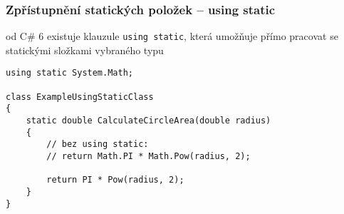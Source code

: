 \begin{frame}[fragile]
\frametitle{Zpřístupnění statických položek -- using static}
\vfill
\begin{bitemize}{}
\item od C\# 6 existuje klauzule \lstinline|using static|, která umožňuje přímo pracovat se statickými složkami vybraného typu
\end{bitemize}
\vfill
\begin{yesblock}
\begin{lstlisting}
using static System.Math;

class ExampleUsingStaticClass
{
    static double CalculateCircleArea(double radius)
    {
        // bez using static:
        // return Math.PI * Math.Pow(radius, 2);
        
        return PI * Pow(radius, 2);
    }
}
\end{lstlisting}
\end{yesblock}
\vfill
\end{frame}